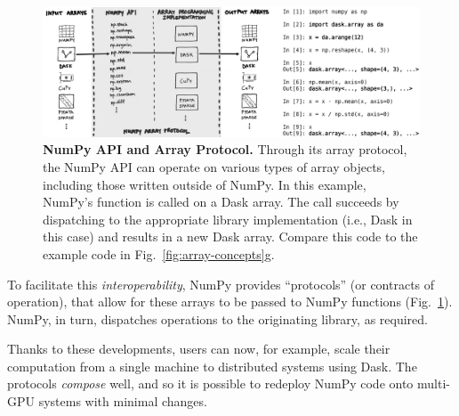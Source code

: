 \begin{figure}
  \centering
  \includegraphics[width=\textwidth]{static/sketches/array_protocol.jpg}

  \caption{\textbf{NumPy API and Array Protocol.} Through its array protocol, the NumPy API
     can operate on various types of array objects, including those written outside
     of NumPy. In this example, NumPy's  function is called on a Dask
     array.  The call succeeds by dispatching to the appropriate library implementation
     (i.e., Dask in this case) and results in a new Dask array.  Compare this
     code to the example code in Fig.~\ref{fig:array-concepts}g.
  }\label{fig:array-protocol}

\end{figure}

To facilitate this \emph{interoperability}, NumPy provides
``protocols'' (or contracts of operation), that allow for these arrays to be
passed to NumPy functions (Fig.~\ref{fig:array-protocol}).
NumPy, in turn, dispatches operations to the originating library, as required.

Thanks to these developments, users can now, for example, scale
their computation from a single machine to distributed systems using Dask. The protocols
\textit{compose} well, and so it is possible to redeploy NumPy code onto multi-GPU systems with minimal changes\cite{entschev2019}.




